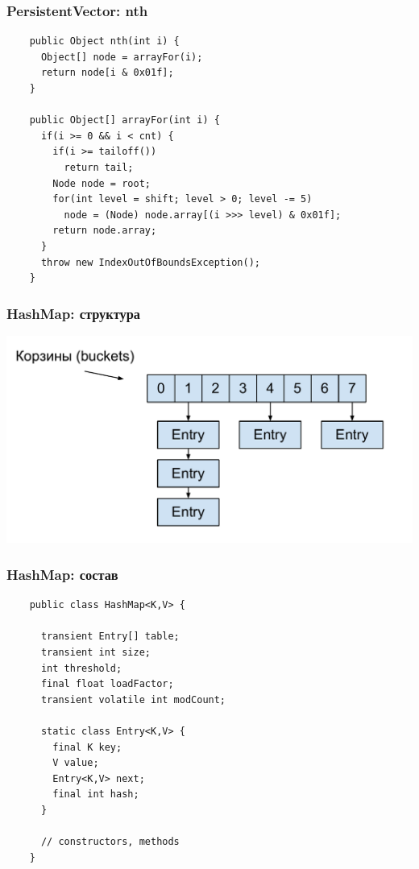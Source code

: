 \documentclass[rpussian]{beamer}
\begin{document}
\begin{frame}[fragile]
  \frametitle{PersistentVector: nth}
  \begin{verbatim}
    public Object nth(int i) {
      Object[] node = arrayFor(i);
      return node[i & 0x01f];
    }

    public Object[] arrayFor(int i) {
      if(i >= 0 && i < cnt) {
        if(i >= tailoff())
          return tail;
        Node node = root;
        for(int level = shift; level > 0; level -= 5)
          node = (Node) node.array[(i >>> level) & 0x01f];
        return node.array;
      }
      throw new IndexOutOfBoundsException();
    }

  \end{verbatim}
\end{frame}

\begin{frame}
  \frametitle{HashMap: структура}
  \includegraphics[width=\textwidth,keepaspectration]{hashmap}
\end{frame}

\begin{frame}[fragile]
  \frametitle{HashMap: состав}
  \begin{verbatim}
    public class HashMap<K,V> {

      transient Entry[] table;
      transient int size;
      int threshold;
      final float loadFactor;
      transient volatile int modCount;

      static class Entry<K,V> {
        final K key;
        V value;
        Entry<K,V> next;
        final int hash;
      }

      // constructors, methods
    }
  \end{verbatim}
\end{frame}
\end{document}
